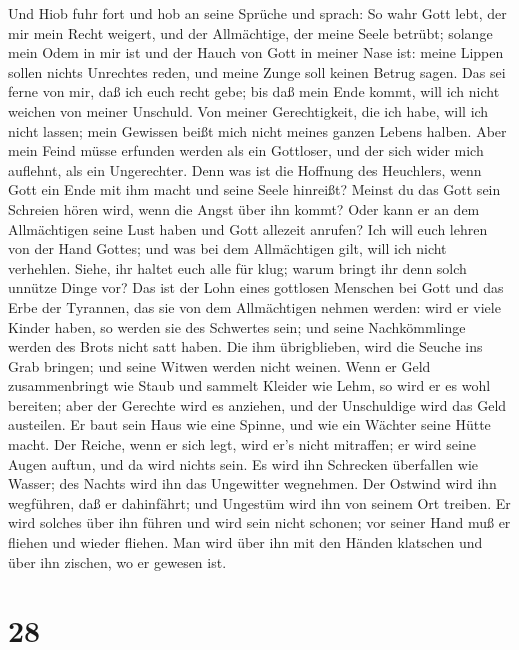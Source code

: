  Und Hiob fuhr fort und hob an seine Sprüche und sprach:
 So wahr Gott lebt, der mir mein Recht weigert, und der
Allmächtige, der meine Seele betrübt;  solange mein Odem in
mir ist und der Hauch von Gott in meiner Nase ist:  meine
Lippen sollen nichts Unrechtes reden, und meine Zunge soll keinen Betrug
sagen.  Das sei ferne von mir, daß ich euch recht gebe; bis
daß mein Ende kommt, will ich nicht weichen von meiner Unschuld.
 Von meiner Gerechtigkeit, die ich habe, will ich nicht
lassen; mein Gewissen beißt mich nicht meines ganzen Lebens halben.
 Aber mein Feind müsse erfunden werden als ein Gottloser,
und der sich wider mich auflehnt, als ein Ungerechter.  Denn
was ist die Hoffnung des Heuchlers, wenn Gott ein Ende mit ihm macht und
seine Seele hinreißt?  Meinst du das Gott sein Schreien
hören wird, wenn die Angst über ihn kommt?  Oder kann er an
dem Allmächtigen seine Lust haben und Gott allezeit anrufen?
 Ich will euch lehren von der Hand Gottes; und was bei dem
Allmächtigen gilt, will ich nicht verhehlen.  Siehe, ihr
haltet euch alle für klug; warum bringt ihr denn solch unnütze Dinge
vor?  Das ist der Lohn eines gottlosen Menschen bei Gott
und das Erbe der Tyrannen, das sie von dem Allmächtigen nehmen werden:
 wird er viele Kinder haben, so werden sie des Schwertes
sein; und seine Nachkömmlinge werden des Brots nicht satt haben.
 Die ihm übrigblieben, wird die Seuche ins Grab bringen;
und seine Witwen werden nicht weinen.  Wenn er Geld
zusammenbringt wie Staub und sammelt Kleider wie Lehm,  so
wird er es wohl bereiten; aber der Gerechte wird es anziehen, und der
Unschuldige wird das Geld austeilen.  Er baut sein Haus wie
eine Spinne, und wie ein Wächter seine Hütte macht.  Der
Reiche, wenn er sich legt, wird er's nicht mitraffen; er wird seine
Augen auftun, und da wird nichts sein.  Es wird ihn
Schrecken überfallen wie Wasser; des Nachts wird ihn das Ungewitter
wegnehmen.  Der Ostwind wird ihn wegführen, daß er
dahinfährt; und Ungestüm wird ihn von seinem Ort treiben. 
Er wird solches über ihn führen und wird sein nicht schonen; vor seiner
Hand muß er fliehen und wieder fliehen.  Man wird über ihn
mit den Händen klatschen und über ihn zischen, wo er gewesen ist.

\hypertarget{section-27}{%
\section{28}\label{section-27}}

